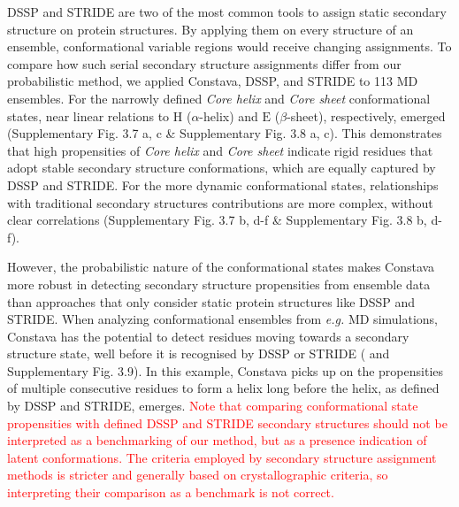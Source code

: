 DSSP \cite{touw_series_2015,kabsch_dictionary_1983} and STRIDE \cite{lovell_structure_2003,frishman_knowledge-based_1995} are two of the most common tools to assign static secondary structure on protein structures. By applying them on every structure of an ensemble, conformational variable regions would receive changing assignments. To compare how such serial secondary structure assignments differ from our probabilistic method, we applied Constava, DSSP, and STRIDE to 113 MD ensembles. For the narrowly defined \textit{Core helix} and \textit{Core sheet} conformational states, near linear relations to $\text{H}$ ($\alpha$-helix) and $\text{E}$ ($\beta$-sheet), respectively, emerged (Supplementary Fig. 3.7 a, c \& Supplementary Fig. 3.8 a, c).
This demonstrates that high propensities of \textit{Core helix} and \textit{Core sheet} indicate rigid residues that adopt stable secondary structure conformations, which are equally captured by DSSP and STRIDE. For the more dynamic conformational states, relationships with traditional secondary structures contributions are more complex, without clear correlations (Supplementary Fig. 3.7 b, d-f \& Supplementary Fig. 3.8 b, d-f).

However, the probabilistic nature of the conformational states makes Constava more robust in detecting secondary structure propensities from ensemble data than approaches that only consider static protein structures like  DSSP and STRIDE. When analyzing conformational ensembles from \textit{e.g.} MD simulations, Constava has the potential to detect residues moving towards a secondary structure state, well before it is recognised by DSSP or STRIDE ( and Supplementary Fig. 3.9).
In this example, Constava picks up on the propensities of multiple consecutive residues to form a helix long before the helix, as defined by DSSP and STRIDE, emerges. \textcolor{red}{Note that comparing conformational state propensities with defined DSSP and STRIDE secondary structures should not be interpreted as a benchmarking of our method, but as a presence indication of latent conformations. The criteria employed by secondary structure assignment methods is stricter and generally based on crystallographic criteria, so interpreting their comparison as a benchmark is not correct.}

